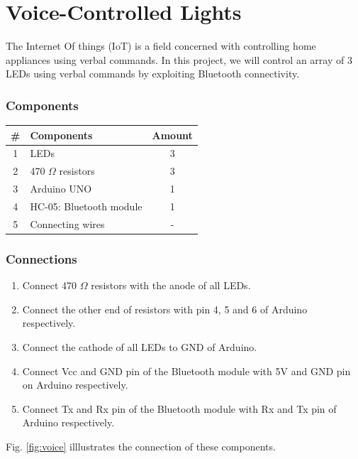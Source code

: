 \chapter{Voice-Controlled Lights}

The Internet Of things (IoT) is a field concerned with controlling home appliances using verbal commands. In this project, we will control an array of 3 LEDs using verbal commands by exploiting Bluetooth connectivity.

\subsection*{Components}
\begin{table}[H]
    \centering
    \begin{tabular}{|c|l|c|}\hline
     \textbf{\#} & \textbf{Components} &  \textbf{Amount}\\\hline
     1 & LEDs                       & 3 \\\hline
     2 & 470 $\Omega$ resistors     & 3 \\\hline
     3 & Arduino UNO                & 1 \\\hline
     4 & HC-05: Bluetooth module    & 1 \\\hline
     5 & Connecting wires           & - \\\hline
    \end{tabular}
\end{table}

\subsection*{Connections}

\begin{enumerate}[leftmargin=*]
    \item Connect 470 $\Omega$ resistors with the anode of all LEDs. 
    \item Connect the other end of resistors with pin 4, 5 and 6 of Arduino respectively.
    \item Connect the cathode of all LEDs to GND of Arduino.
    \item Connect Vcc and GND pin of the Bluetooth module with 5V and GND pin on Arduino respectively. 
    \item Connect Tx and Rx pin of the Bluetooth module with Rx and Tx pin of Arduino respectively. 
\end{enumerate}

Fig. \ref{fig:voice} illlustrates the connection of these components.

